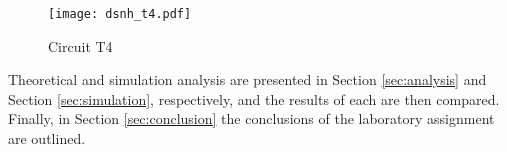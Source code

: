 \begin{figure}[ht]
	\centering
	\texttt{[image: dsnh\_t4.pdf]}
	\caption{Circuit T4}
\label{fig:Desenho_t4}
\end{figure}

Theoretical and simulation analysis are presented in Section \ref{sec:analysis} and Section \ref{sec:simulation}, respectively, and the results of each are then compared.
Finally, in Section \ref{sec:conclusion} the conclusions of the laboratory assignment are outlined.

